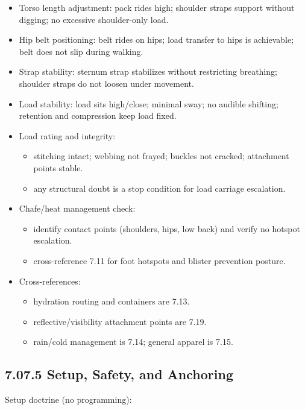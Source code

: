 \documentclass[10pt]{article}
\begin{document}
\begin{itemize}
\item Torso length adjustment: pack rides high; shoulder straps support without digging; no excessive shoulder-only load.
\item Hip belt positioning: belt rides on hips; load transfer to hips is achievable; belt does not slip during walking.
\item Strap stability: sternum strap stabilizes without restricting breathing; shoulder straps do not loosen under movement.
\item Load stability: load sits high/close; minimal sway; no audible shifting; retention and compression keep load fixed.
\item Load rating and integrity:
  \begin{itemize}
  \item stitching intact; webbing not frayed; buckles not cracked; attachment points stable.
  \item any structural doubt is a stop condition for load carriage escalation.
  \end{itemize}
\item Chafe/heat management check:
  \begin{itemize}
  \item identify contact points (shoulders, hips, low back) and verify no hotspot escalation.
  \item cross-reference 7.11 for foot hotspots and blister prevention posture.
  \end{itemize}
\item Cross-references:
  \begin{itemize}
  \item hydration routing and containers are 7.13.
  \item reflective/visibility attachment points are 7.19.
  \item rain/cold management is 7.14; general apparel is 7.15.
  \end{itemize}
\end{itemize}

\subsection*{7.07.5 Setup, Safety, and Anchoring}
{}

Setup doctrine (no programming):
\end{document}

